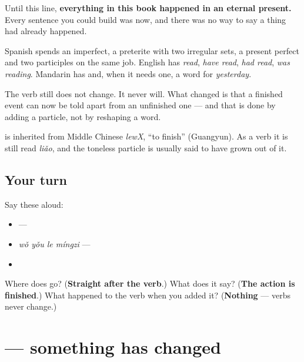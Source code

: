 \begin{grammarlens}[title={What you've built — the past this book could not reach}]
Until this line, \textbf{everything in this book happened in an eternal present.} Every sentence you could build was now, and there was no way to say a thing had already happened.

Spanish spends an imperfect, a preterite with two irregular sets, a present perfect and two participles on the same job. English has \emph{read}, \emph{have read}, \emph{had read}, \emph{was reading}. Mandarin has \textbf{} and, when it needs one, a word for \emph{yesterday}.

The verb still does not change. It never will. What changed is that a finished event can now be told apart from an unfinished one — and that is done by adding a particle, not by reshaping a word.
\end{grammarlens}

\begin{cousinweb}
\textbf{} is inherited from Middle Chinese \emph{lewX}, \textquotedblleft{}to finish\textquotedblright{} (Guangyun). As a verb it is still read \emph{liǎo}, and the toneless particle is usually said to have grown out of it.
\end{cousinweb}

\subsection*{Your turn}
Say these aloud:

\begin{itemize}
\raggedright
  \item {} — 
  \item \emph{wǒ yǒu le míngzi} — 
  \item {}
\end{itemize}

\begin{tcolorbox}[breakable,colback=teal!4,colframe=teal!35!black,title={Before you move on}]
Where does  go? (\textbf{Straight after the verb}.) What does it say? (\textbf{The action is finished}.) What happened to the verb when you added it? (\textbf{Nothing} — verbs never change.)
\end{tcolorbox}
\section[\texorpdfstring{\zh{我是大学生了} (wǒ shì dàxuéshēng le)}{我是大学生了 (wǒ shì dàxuéshēng le)}]{ — something has changed}

